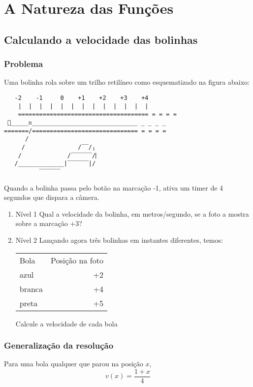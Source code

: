 \documentclass{article}
\author{Gustavo}
\date{\today}
\title{}
\begin{document}
\tableofcontents



\section{A Natureza das Funções}
\label{sec:orgd5d9490}

\subsection{Calculando a velocidade das bolinhas}
\label{sec:orged3bc27}
\subsubsection{Problema}
\label{sec:orgb244b3b}
Uma bolinha rola sobre um trilho retilíneo como esquematizado na figura abaixo:

\begin{verbatim}
   -2    -1     0    +1    +2    +3    +4
    |  |  |  |  |  |  |  |  |  |  |  |  | 
    ===================================== = = = =
 🎱_____ᴨ______________________________ _ _ _ _ 
=======/============================== = = = =
      /                    
     /               /‾‾/╷
    /             /‾‾‾‾‾‾/⎸     
   /_____________|‾‾‾‾‾‾|/ 
		  ‾‾‾‾‾‾ 
\end{verbatim}

Quando a bolinha passa pelo botão na marcação -1, ativa um timer de 4 segundos
que dispara a câmera.

\begin{enumerate}
\item Nível 1
\label{sec:org1b463c5}
Qual a velocidade da bolinha, em metros/segundo, se a foto a mostra sobre a marcação +3?

\item Nível 2
\label{sec:org14bfe6f}
Lançando agora três bolinhas em instantes diferentes, temos:
\begin{center}
\begin{tabular}{lr}
Bola & Posição na foto\\
azul & +2\\
branca & +4\\
preta & +5\\
\end{tabular}
\end{center}

Calcule a velocidade de cada bola
\end{enumerate}

\subsubsection{Generalização da resolução}
\label{sec:org1509224}
Para uma bola qualquer que parou na posição \(x\),
\[
v(x) = \frac{1 + x}{4}
\]
\end{document}
